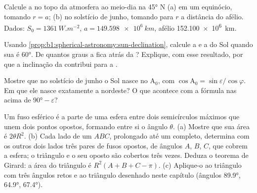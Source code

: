 \begin{exercise}[$\star\star$]\label{exo:b1:spherical-astronomy:9}
Calcule a  no topo da atmosfera ao meio-dia na  \ang{45} N (a) em um equinócio, tomando $r = a$; (b) no solstício de junho, tomando para $r$ a distância do afélio. Dados: $S_0 = \qty{1361}{W.m^{-2}}$, $a = \qty{149.598e6}{km}$, afélio \qty{152.100e6}{km}.
\end{exercise}

\begin{exercise}[$\star\star\star$]\label{exo:b1:spherical-astronomy:10}
Usando \cref{prop:b1:spherical-astronomy:sun-declination}, calcule a  e a  do Sol quando sua   é \ang{60}. De quantos graus a  fica atrás da ? Explique, com esse resultado, por que a inclinação da  contribui para a .
\end{exercise}

\begin{exercise}[$\star\star\star$]\label{exo:b1:spherical-astronomy:11}
Mostre que no solstício de junho o Sol nasce no  $\mathrm{A}_0$, com $\cos\mathrm{A}_0 = \sin\varepsilon/\cos\varphi$. Em que  ele nasce exatamente a nordeste? O que acontece com a fórmula nas  acima de $\ang{90} - \varepsilon$?
\end{exercise}

\begin{exercise}[$\star\star\star$]\label{exo:b1:spherical-astronomy:12}
Um fuso esférico é a parte de uma esfera entre dois semicírculos máximos que unem dois pontos opostos, formando entre si o ângulo $\theta$. (a) Mostre que sua área é $2\theta R^2$. (b) Cada lado de um  $ABC$, prolongado até um  completo, determina com os outros dois lados três pares de fusos opostos, de ângulos $A$, $B$, $C$, que cobrem a esfera; o triângulo e o seu oposto são cobertos três vezes. Deduza o teorema de Girard: a área do triângulo é $R^2(A + B + C - \pi)$. (c) Aplique-o ao triângulo com três ângulos retos e ao triângulo desenhado neste capítulo (ângulos \ang{89.9}, \ang{64.9}, \ang{67.4}).
\end{exercise}

